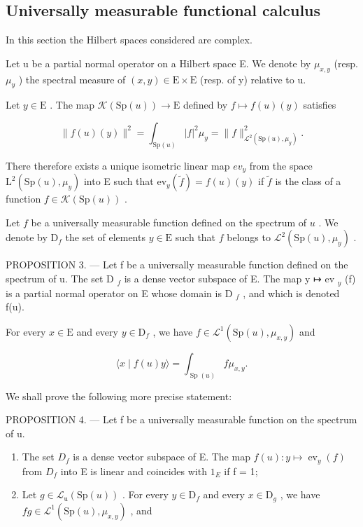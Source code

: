 \subsection{Universally measurable functional calculus}

In this section the Hilbert spaces considered are complex.

Let u be a partial normal operator on a Hilbert space E. We denote by \(\mu_{x,y}\) (resp. \(\mu_{y}\) ) the spectral measure of \((x,y)\in\mathrm{E}\times\mathrm{E}\) (resp. of y) relative to u.

Let \(y \in \mathrm{E}\) . The map \(\mathcal{K}(\mathrm{Sp}(u)) \to \mathrm{E}\) defined by \(f \mapsto f(u)(y)\) satisfies

\[
\| f (u) (y) \| ^ {2} = \int_ {\mathrm{Sp} (u)} | f | ^ {2} \mu_ {y} = \| f \| _ {\mathcal {L} ^ {2} (\mathrm{Sp} (u), \mu_ {y})} ^ {2}.
\]

There therefore exists a unique isometric linear map \(ev_{y}\) from the space \(\mathrm{L}^{2}(\mathrm{Sp}(u),\mu_{y})\) into E such that \(\mathrm{ev}_{y}(\widetilde{f})=f(u)(y)\) if \(\widetilde{f}\) is the class of a function \(f\in\mathcal{K}(\mathrm{Sp}(u))\) .

Let \(f\) be a universally measurable function defined on the spectrum of \(u\) . We denote by \(\mathrm{D}_{f}\) the set of elements \(y \in \mathrm{E}\) such that \(f\) belongs to \(\mathcal{L}^{2}(\mathrm{Sp}(u), \mu_{y})\) .

PROPOSITION 3. --- Let f be a universally measurable function defined on the spectrum of u. The set D \(_{f}\) is a dense vector subspace of E. The map y ↦ ev \(_{y}\) (f) is a partial normal operator on E whose domain is D \(_{f}\) , and which is denoted f(u).

For every \(x \in \mathrm{E}\) and every \(y \in \mathrm{D}_f\) , we have \(f \in \mathcal{L}^1(\mathrm{Sp}(u), \mu_{x,y})\) and

\[
\langle x \mid f (u) y \rangle = \int_ {\operatorname{Sp} (u)} f \mu_ {x, y}.\tag{6}
\]

We shall prove the following more precise statement:

PROPOSITION 4. --- Let f be a universally measurable function on the spectrum of u.

\begin{enumerate}
\def\labelenumi{\alph{enumi})}
\item
  The set \(D_{f}\) is a dense vector subspace of E. The map \(f(u): y \mapsto \operatorname{ev}_{y}(f)\) from \(D_{f}\) into E is linear and coincides with \(1_{E}\) if f = 1;
\item
  Let \(g \in \mathcal{L}_{\mathrm{u}}(\mathrm{Sp}(u))\) . For every \(y \in \mathrm{D}_f\) and every \(x \in \mathrm{D}_g\) , we have \(fg \in \mathcal{L}^1(\mathrm{Sp}(u), \mu_{x,y})\) , and
\end{enumerate}

